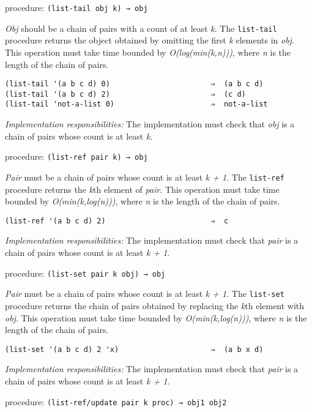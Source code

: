 procedure: \texttt{(list-tail\ obj\ k)\ →\ obj}

\emph{Obj} should be a chain of pairs with a count of at least \emph{k}.
The \texttt{list-tail} procedure returns the object obtained by omitting
the first \emph{k} elements in \emph{obj}. This operation must take time
bounded by \emph{O(log(min(k,n)))}, where \emph{n} is the length of the
chain of pairs.

\begin{verbatim}
(list-tail '(a b c d) 0)                       ⇒  (a b c d)
(list-tail '(a b c d) 2)                       ⇒  (c d)
(list-tail 'not-a-list 0)                      ⇒  not-a-list
\end{verbatim}

\emph{Implementation responsibilities:} The implementation must check
that \emph{obj} is a chain of pairs whose count is at least \emph{k}.

procedure: \texttt{(list-ref\ pair\ k)\ →\ obj}

\emph{Pair} must be a chain of pairs whose count is at least \emph{k +
1}. The \texttt{list-ref} procedure returns the \emph{k}th element of
\emph{pair}. This operation must take time bounded by
\emph{O(min(k,log(n)))}, where \emph{n} is the length of the chain of
pairs.

\begin{verbatim}
(list-ref '(a b c d) 2)                        ⇒  c
\end{verbatim}

\emph{Implementation responsibilities:} The implementation must check
that \emph{pair} is a chain of pairs whose count is at least \emph{k +
1}.

procedure: \texttt{(list-set\ pair\ k\ obj)\ →\ obj}

\emph{Pair} must be a chain of pairs whose count is at least \emph{k +
1}. The \texttt{list-set} procedure returns the chain of pairs obtained
by replacing the \emph{k}th element with \emph{obj}. This operation must
take time bounded by \emph{O(min(k,log(n)))}, where \emph{n} is the
length of the chain of pairs.

\begin{verbatim}
(list-set '(a b c d) 2 'x)                     ⇒  (a b x d)
\end{verbatim}

\emph{Implementation responsibilities:} The implementation must check
that \emph{pair} is a chain of pairs whose count is at least \emph{k +
1}.

procedure: \texttt{(list-ref/update\ pair\ k\ proc)\ →\ obj1\ obj2}

